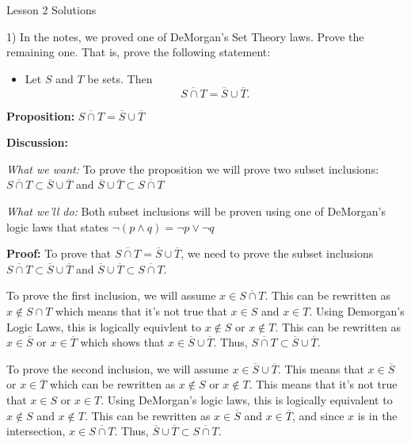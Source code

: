 



    \begin{center}
        \huge \sc Lesson 2 Solutions
    \end{center}

    \begin{paragraph}{1)}
    In the notes, we proved one of DeMorgan's Set Theory laws.  Prove the remaining one.  That is, prove the following statement:
    
    \begin{itemize}

        \item[]  Let $S$ and $T$ be sets.  Then $$\overline{S \cap T} = \overline S \cup \overline T.$$
        
    \end{itemize}
    \separate\spacing

    \textbf{Proposition:} $\overline{S \cap T} = \overline{S} \cup \overline{T}$ \spacing 

    \textbf{Discussion:} 
    \spacing

    \textit{What we want:} To prove the proposition we will prove two subset inclusions: 
    $\overline{S \cap T} \subset \overline{S} \cup \overline{T}$ and
    $\overline{S} \cup \overline{T} \subset \overline{S \cap T}$
    \spacing
    
    \textit{What we'll do:} Both subset inclusions will be proven
    using one of DeMorgan's logic laws that states 
    $\neg(p \land q) = \neg p \lor \neg q$ 
    \spacing

    \textbf{Proof:} To prove that $\overline{S \cap T} = \overline{S} \cup \overline{T}$,
    we need to prove the subset inclusions 
    $\overline{S \cap T} \subset \overline{S} \cup \overline{T}$ and
    $\overline{S} \cup \overline{T} \subset \overline{S \cap T}$.
    \spacing
    
    To prove the first inclusion, we will assume $x \in \overline{S \cap T}.$
    This can be rewritten as $x \notin S \cap T$ which means that it's 
    not true that $x \in S$ and $x \in T$. Using Demorgan's Logic Laws,
    this is logically equivlent to $x \notin S$ or $x \notin T$. This
    can be rewritten as $x \in \overline{S}$ or $x \in \overline{T}$
    which shows that $x \in \overline{S} \cup \overline{T}$. Thus, 
    $\overline{S \cap T} \subset \overline{S} \cup \overline{T}$.
    \spacing
    
    To prove the second inclusion, we will assume $x \in \overline{S} \cup \overline{T}$.
    This means that $x \in \overline{S}$ or $x \in \overline{T}$ which can be rewritten as
    $x \notin S$ or $x \notin T$. This means that it's not true that $x \in S$ or $x \in T$.
    Using DeMorgan's logic laws, this is logically equivalent to $x \notin S$ and $x \notin T$.
    This can be rewritten as $x \in \overline{S}$ and $x \in \overline{T}$, and since $x$
    is in the intersection, $x \in \overline{S \cap T}$. Thus, 
    $\overline{S} \cup \overline{T} \subset \overline{S \cap T}$. 
    \spacing


\end{paragraph}
